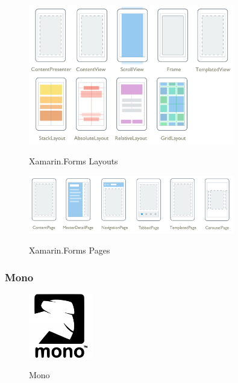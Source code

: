 \begin{figure}[h]
	\begin{center}
		\includegraphics[width=0.8\textwidth]{images/technische_grundlagen/layout.png}
	\end{center}	
	\caption{Xamarin.Forms Layouts}
	\cite{Xamarin.Xamarin.FormsLayouts}
	\label{fig:layout}
\end{figure}

\noindent

\begin{figure}[h]
	\begin{center}
		\includegraphics[width=0.8\textwidth]{images/technische_grundlagen/pages.png}
	\end{center}	
	\caption{Xamarin.Forms Pages}
	\cite{Xamarin.Xamarin.FormsPages}
	\label{fig:pages}
\end{figure}

\newpage
\subsubsection{Mono}\label{mono}

\begin{figure}
	\begin{center}
		\includegraphics[width=0.25\textwidth]{images/technische_grundlagen/mono.png}
	\end{center}
	\caption{Mono}
	\cite{Mono.MonoProject}
	\label{fig:mono}
\end{figure}

